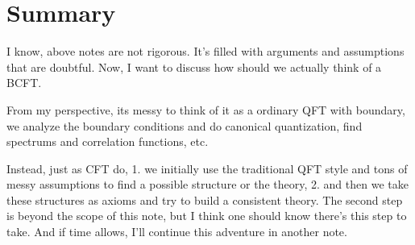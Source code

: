 \section{Summary}

I know, above notes are not rigorous. It's filled with arguments and
assumptions that are doubtful. Now, I want to discuss how should we
actually think of a BCFT.

From my perspective, its messy to think of it as a ordinary QFT with
boundary, we analyze the boundary conditions and do canonical
quantization, find spectrums and correlation functions, etc.

Instead, just as CFT do, 1. we initially use the traditional QFT style
and tons of messy assumptions to find a possible structure or the
theory, 2.  and then we take these structures as axioms and try to build
a consistent theory. The second step is beyond the scope of this
note, but I think one should know there's this step to take. And if
time allows, I'll continue this adventure in another note.

